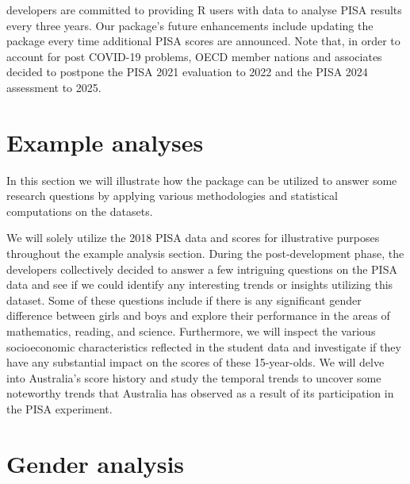  developers are committed to providing R users
with data to analyse PISA results every three years. Our package's
future enhancements include updating the package every time additional
PISA scores are announced. Note that, in order to account for post
COVID-19 problems, OECD member nations and associates decided to
postpone the PISA 2021 evaluation to 2022 and the PISA 2024 assessment
to 2025.

\hypertarget{example-analyses}{%
\section{Example analyses}\label{example-analyses}}

In this section we will illustrate how the 
package can be utilized to answer some research questions by applying
various methodologies and statistical computations on the
 datasets.

We will solely utilize the 2018 PISA data and scores for illustrative
purposes throughout the example analysis section. During the
post-development phase, the  developers
collectively decided to answer a few intriguing questions on the PISA
data and see if we could identify any interesting trends or insights
utilizing this dataset. Some of these questions include if there is any
significant gender difference between girls and boys and explore their
performance in the areas of mathematics, reading, and science.
Furthermore, we will inspect the various socioeconomic characteristics
reflected in the student data and investigate if they have any
substantial impact on the scores of these 15-year-olds. We will delve
into Australia's score history and study the temporal trends to uncover
some noteworthy trends that Australia has observed as a result of its
participation in the PISA experiment.

\hypertarget{gender-analysis}{%
\section{Gender analysis}\label{gender-analysis}}

